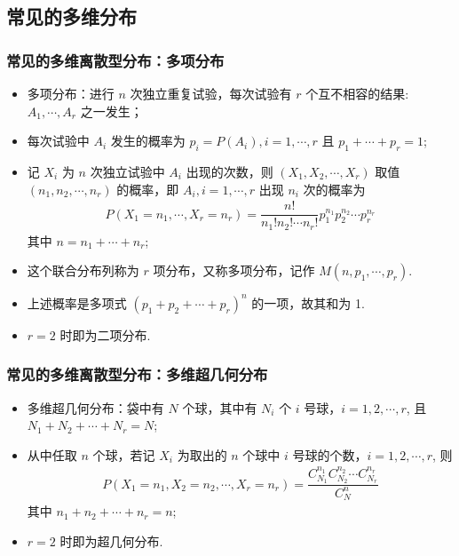 \documentclass[Prob-All.tex]{subfiles}
\begin{document}
\subsection{常见的多维分布}
\begin{frame}
\frametitle{常见的多维离散型分布：多项分布}
\begin{itemize}[<+-|alert@+>]
\item 多项分布：进行 $n$ 次独立重复试验，每次试验有 $r$ 个互不相容的结果:$A_1,\cdots, A_r$ 之一发生；
\item 每次试验中 $A_i$ 发生的概率为 $p_i=P (A_i), i=1,\cdots,  r$ 且 $p_1+\cdots +p_r=1$;
\item 记 $X_i$ 为 $n$ 次独立试验中 $A_i$ 出现的次数，则 $(X_1,X_2,\cdots,X_r)$ 取值 $(n_1,n_2,\cdots,n_r)$ 的概率，即 $A_i,i=1,\cdots, r$ 出现 $n_i$ 次的概率为
\pause  \begin{eqnarray*}
	P(X_1=n_1,\cdots, X_r=n_r)=\dfrac{n!}{n_1!n_2!\cdots n_r!}p_1^{n_1}p_2^{n_2}\cdots p_r^{n_r}
\end{eqnarray*}
其中 $n=n_1+\cdots+n_r$;
\item 这个联合分布列称为 $r$ 项分布，又称多项分布，记作 $M (n,p_1,\cdots,p_r)$.
\item 上述概率是多项式 $(p_1+p_2+\cdots+p_r)^n$ 的一项，故其和为 1.
\item $r=2$ 时即为二项分布.
\end{itemize}
\end{frame}
\begin{frame}
	\frametitle{常见的多维离散型分布：多维超几何分布}
	\begin{itemize}
		\item 多维超几何分布：袋中有 $N$ 个球，其中有 $N_i$ 个 $i$ 号球，$i=1,2,\cdots, r$, 且 $N_1+N_2+\cdots +N_r=N$;
		\item 从中任取 $n$ 个球，若记 $X_i$ 为取出的 $n$ 个球中 $i$ 号球的个数，$i=1,2,\cdots, r$, 则 \pause
		\begin{eqnarray*}
			P(X_1=n_1,X_2=n_2,\cdots, X_r=n_r)=\dfrac{C_{N_1}^{n_1}C_{N_2}^{n_2}\cdots C_{N_r}^{n_r}}{C_{N}^n}
		\end{eqnarray*}
		其中 $n_1+n_2+\cdots+n_r=n$;
		\item $r=2$ 时即为超几何分布.\end{itemize}
\end{frame}
\end{document}
